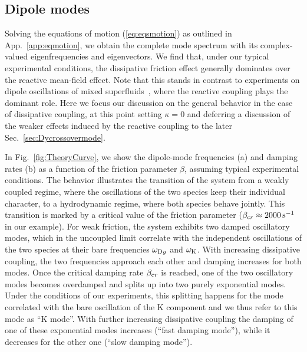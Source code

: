 \subsection{Dipole modes}

Solving the equations of motion (\ref{eq:eqsmotion}) as outlined in App.~\ref{app:eqmotion}, we obtain the complete mode spectrum with its complex-valued eigenfrequencies and eigenvectors. We find that, under {our typical experimental conditions}, the dissipative friction effect generally dominates over the reactive mean-field effect.
{Note that this stands in contrast to experiments on dipole oscillations of mixed superfluids~\cite{Ferrierbarbut2014amo, Wu2018cdo}, where the reactive coupling plays the dominant role.}
{Here we focus our discussion on the general behavior in the case of dissipative coupling, at this point setting $\kappa=0$ and deferring a discussion of the weaker effects} induced by the reactive coupling to the later Sec.~\ref{sec:Dycrossovermode}. 

{
In Fig.~\ref{fig:TheoryCurve}, we show the dipole-mode frequencies (a) and damping rates (b) as a function of the friction parameter $\beta$, assuming typical experimental conditions. 
The behavior illustrates the transition of the system from a weakly coupled regime, where the oscillations of the two species keep their individual character, to a hydrodynamic regime, where both species behave jointly.
This transition is marked by a critical value of the friction parameter ($\beta_{\textrm cr} \approx 2000\,{\textrm s}^{-1}$ in our example).
For weak friction, the system exhibits two damped oscillatory modes, which in the uncoupled limit correlate with the independent oscillations of the two species at their bare frequencies $\omega_{\textrm Dy}$ and $\omega_{\textrm K}$. With increasing dissipative coupling, the two frequencies approach each other and damping increases for both modes.
Once the critical damping rate $\beta_{\textrm cr}$ is reached, one of the two oscillatory modes %
becomes  overdamped and splits up into two purely exponential modes. Under the conditions of our experiments, this splitting happens for the mode correlated with the bare oscillation of the K component and we thus refer to this mode as ``K mode''. With further increasing dissipative coupling the damping of one of these exponential modes increases (``fast damping mode''), while it decreases for the other one (``slow damping mode''). 
}

